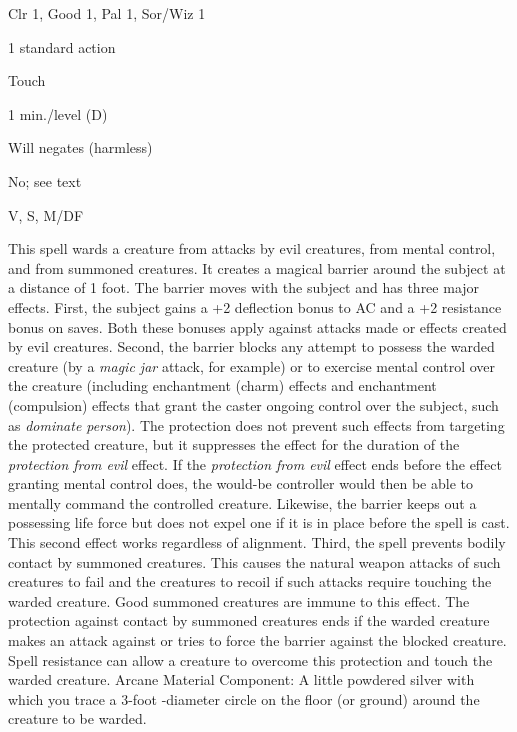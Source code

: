 
\begin{description*}
\item[Level:] Clr 1, Good 1, Pal 1, Sor/Wiz 1
\item[Casting Time:] 1 standard action
\item[Range:] Touch
\item[Duration:] 1 min./level (D)
\item[Saving Throw:] Will negates (harmless)
\item[Spell Resistance:] No; see text
\item[Components:] V, S, M/DF
\end{description*}

This spell wards a creature from attacks by evil creatures, from mental control,
and from summoned creatures. It creates a magical barrier around the subject at
a distance of 1 foot. The barrier moves with the subject and has three major effects.
First, the subject gains a +2 deflection bonus to AC and a +2 resistance bonus
on saves. Both these bonuses apply against attacks made or effects created by evil
creatures.
Second, the barrier blocks any attempt to possess the warded creature (by a \textit{magic
jar} attack, for example) or to exercise mental control over the creature (including
enchantment (charm) effects and enchantment (compulsion) effects that grant the
caster ongoing control over the subject, such as \textit{dominate person}). The
protection does not prevent such effects from targeting the protected creature,
but it suppresses the effect for the duration of the \textit{protection from evil
}effect. If the \textit{protection from evil} effect ends before the effect granting
mental control does, the would-be controller would then be able to mentally command
the controlled creature. Likewise, the barrier keeps out a possessing life force
but does not expel one if it is in place before the spell is cast. This second
effect works regardless of alignment.
Third, the spell prevents bodily contact by summoned creatures. This causes the
natural weapon attacks of such creatures to fail and the creatures to recoil if
such attacks require touching the warded creature. Good summoned creatures are
immune to this effect. The protection against contact by summoned creatures ends
if the warded creature makes an attack against or tries to force the barrier against
the blocked creature. Spell resistance can allow a creature to overcome this protection
and touch the warded creature.
Arcane Material Component: A little powdered silver with which you trace
a 3-foot -diameter circle on the floor (or ground) around the creature to be warded.